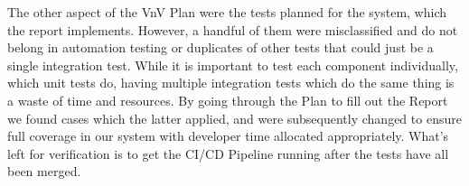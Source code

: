 \documentclass[12pt, titlepage]{article}
\begin{document}
\noindent The other aspect of the VnV Plan were the tests planned for the system, which the report implements. However, a handful of them were misclassified and do not belong in automation testing or duplicates of other tests that could just be a single integration test. While it is important to test each component individually, which unit tests do, having multiple integration tests which do the same thing is a waste of time and resources. By going through the Plan to fill out the Report we found cases which the latter applied, and were subsequently changed to ensure full coverage in our system with developer time allocated appropriately. What's left for verification is to get the CI/CD Pipeline running after the tests have all been merged.




\end{document}
